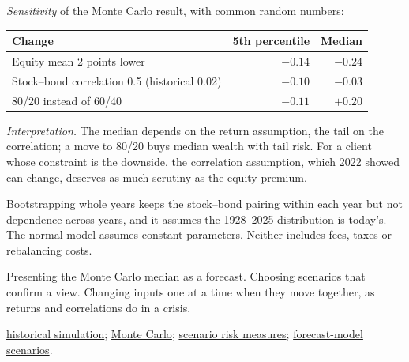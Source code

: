 \begin{qfmethod}
\emph{Sensitivity} of the Monte Carlo result, with common random numbers:
\begin{center}\small
\begin{tabular}{@{}lrr@{}}
\toprule
Change & 5th percentile & Median \\
\midrule
Equity mean 2 points lower & $-0.14$ & $-0.24$ \\
Stock--bond correlation 0.5 (historical 0.02) & $-0.10$ & $-0.03$ \\
80/20 instead of 60/40 & $-0.11$ & $+0.20$ \\
\bottomrule
\end{tabular}
\end{center}
\emph{Interpretation.} The median depends on the return assumption, the tail on the correlation; a move to 80/20 buys median wealth with tail risk. For a client whose constraint is the downside, the correlation assumption, which 2022 showed can change, deserves as much scrutiny as the equity premium.

 Bootstrapping whole years keeps the stock--bond pairing within each year but not dependence across years, and it assumes the 1928--2025 distribution is today's. The normal model assumes constant parameters. Neither includes fees, taxes or rebalancing costs.

 Presenting the Monte Carlo median as a forecast. Choosing scenarios that confirm a view. Changing inputs one at a time when they move together, as returns and correlations do in a crisis.

 \hyperref[meth:historical-simulation]{historical simulation}; \hyperref[meth:monte-carlo-simulation]{Monte Carlo}; \hyperref[meth:sensitivity-scenario-risk-measures]{scenario risk measures}; \hyperref[meth:forecast-model-valuation]{forecast-model scenarios}.

\end{qfmethod}
